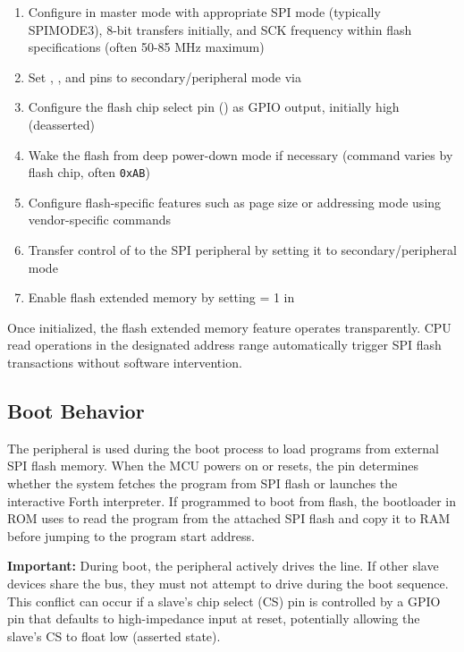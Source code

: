 \begin{enumerate}
	\item Configure  in master mode with appropriate SPI mode (typically SPIMODE3), 8-bit transfers initially, and SCK frequency within flash specifications (often 50-85 MHz maximum)
	\item Set , , and  pins to secondary/peripheral mode via 
	\item Configure the flash chip select pin () as GPIO output, initially high (deasserted)
	\item Wake the flash from deep power-down mode if necessary (command varies by flash chip, often \texttt{0xAB})
	\item Configure flash-specific features such as page size or addressing mode using vendor-specific commands
	\item Transfer control of  to the SPI peripheral by setting it to secondary/peripheral mode
	\item Enable flash extended memory by setting  = 1 in 
\end{enumerate}

Once initialized, the flash extended memory feature operates transparently. CPU read operations in the designated address range automatically trigger SPI flash transactions without software intervention.



\subsection{ Boot Behavior}

The  peripheral is used during the boot process to load programs from external SPI flash memory. When the MCU powers on or resets, the  pin determines whether the system fetches the program from SPI flash or launches the interactive Forth interpreter. If programmed to boot from flash, the bootloader in ROM uses  to read the program from the attached SPI flash and copy it to RAM before jumping to the program start address.

\textbf{Important:} During boot, the  peripheral actively drives the  line. If other slave devices share the  bus, they must not attempt to drive  during the boot sequence. This conflict can occur if a slave's chip select (CS) pin is controlled by a GPIO pin that defaults to high-impedance input at reset, potentially allowing the slave's CS to float low (asserted state).

